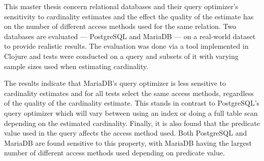 This master thesis concern relational databases and their query optimizer's
sensitivity to cardinality estimates and the effect the quality of the estimate
has on the number of different access methods used for the same relation. Two
databases are evaluated --- PostgreSQL and MariaDB --- on a real-world dataset
to provide realistic results. The evaluation was done via a tool implemented in
Clojure and tests were conducted on a query and subsets of it with varying
sample sizes used when estimating cardinality.

The results indicate that MariaDB's query optimizer is less sensitive to
cardinality estimates and for all tests select the same access methods,
regardless of the quality of the cardinality estimate. This stands in contrast
to PostgreSQL's query optimizer which will vary between using an index or doing
a full table scan depending on the estimated cardinality. Finally, it is also
found that the predicate value used in the query affects the access method used.
Both PostgreSQL and MariaDB are found sensitive to this property, with MariaDB
having the largest number of different access methods used depending on
predicate value.
